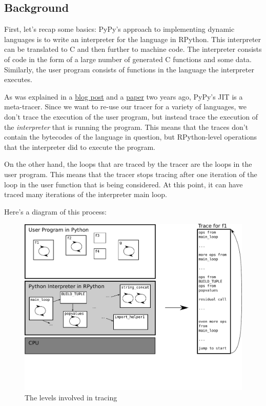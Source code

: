 \documentclass{sig-alternate}
\begin{document}

\subsection{Background}

First, let's recap some basics: PyPy's approach to implementing dynamic
languages is to write an interpreter for
the language in RPython. This interpreter can be translated to C and then
further to machine code. The interpreter consists of code in the form of a
large number of generated C functions and some data. Similarly, the user
program consists of functions in the language the interpreter executes.

As was explained in a \href{http://morepypy.blogspot.com/2009/03/applying-tracing-jit-to-interpreter.html}{blog post} and a \href{http://codespeak.net/svn/pypy/extradoc/talk/icooolps2009/bolz-tracing-jit.pdf}{paper} two years ago, PyPy's JIT is a
meta-tracer. Since we want to re-use our tracer for a variety of languages, we
don't trace the execution of the user program, but instead trace the execution
of the \emph{interpreter} that is running the program. This means that the traces
don't contain the bytecodes of the language in question, but RPython-level
operations that the interpreter did to execute the program.

On the other hand, the loops that are traced by the tracer are the loops in the
user program. This means that the tracer stops tracing after one iteration of
the loop in the user function that is being considered. At this point, it can
have traced many iterations of the interpreter main loop.

Here's a diagram of this process:

\begin{figure}
\includegraphics[scale=0.5]{figures/trace-levels}
\caption{The levels involved in tracing}
\label{fig:trace-levels}
\end{figure}
\end{document}
